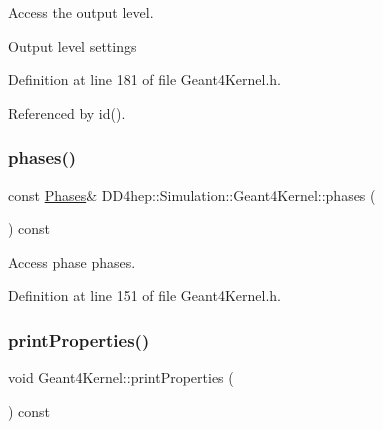 Access the output level. 

Output level settings 

Definition at line 181 of file Geant4\+Kernel.\+h.



Referenced by id().

\hypertarget{class_d_d4hep_1_1_simulation_1_1_geant4_kernel_a94a98c5bbbd6cca43e9aecfaa135ef65}{}\label{class_d_d4hep_1_1_simulation_1_1_geant4_kernel_a94a98c5bbbd6cca43e9aecfaa135ef65} 
\subsubsection{\texorpdfstring{phases()}{phases()}}
{\footnotesize\ttfamily const \hyperlink{class_d_d4hep_1_1_simulation_1_1_geant4_kernel_ae28985781d4226ece4c3fffe8827b400}{Phases}\& D\+D4hep\+::\+Simulation\+::\+Geant4\+Kernel\+::phases (\begin{DoxyParamCaption}{ }\end{DoxyParamCaption}) const\hspace{0.3cm}{\ttfamily [inline]}}



Access phase phases. 



Definition at line 151 of file Geant4\+Kernel.\+h.

\hypertarget{class_d_d4hep_1_1_simulation_1_1_geant4_kernel_a3a4988323078c97accc89fcc5e5f5750}{}\label{class_d_d4hep_1_1_simulation_1_1_geant4_kernel_a3a4988323078c97accc89fcc5e5f5750} 
\subsubsection{\texorpdfstring{print\+Properties()}{printProperties()}}
{\footnotesize\ttfamily void Geant4\+Kernel\+::print\+Properties (\begin{DoxyParamCaption}{ }\end{DoxyParamCaption}) const}



